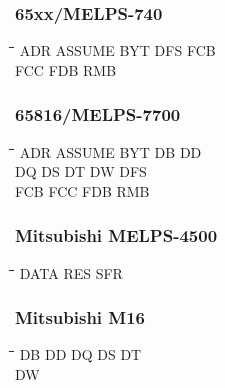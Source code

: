 \subsubsection{65xx/MELPS-740}
{\tt\begin{tabbing}
\hspace{3cm}\=\hspace{3cm}\=\hspace{3cm}\=\hspace{3cm}\=\kill
ADR        \> ASSUME      \> BYT         \> DFS         \> FCB \\
FCC        \> FDB         \> RMB \\
\end{tabbing}}

\subsubsection{65816/MELPS-7700}
{\tt\begin{tabbing}
\hspace{3cm}\=\hspace{3cm}\=\hspace{3cm}\=\hspace{3cm}\=\kill
ADR        \> ASSUME      \> BYT         \> DB          \> DD \\
DQ         \> DS          \> DT          \> DW          \> DFS \\
FCB        \> FCC         \> FDB         \> RMB \\
\end{tabbing}}

\subsubsection{Mitsubishi MELPS-4500}
{\tt\begin{tabbing}
\hspace{3cm}\=\hspace{3cm}\=\hspace{3cm}\=\hspace{3cm}\=\kill
DATA       \> RES         \> SFR \\
\end{tabbing}}

\subsubsection{Mitsubishi M16}
{\tt\begin{tabbing}
\hspace{3cm}\=\hspace{3cm}\=\hspace{3cm}\=\hspace{3cm}\=\kill
DB         \> DD          \> DQ          \> DS          \> DT \\
DW \\
\end{tabbing}}


